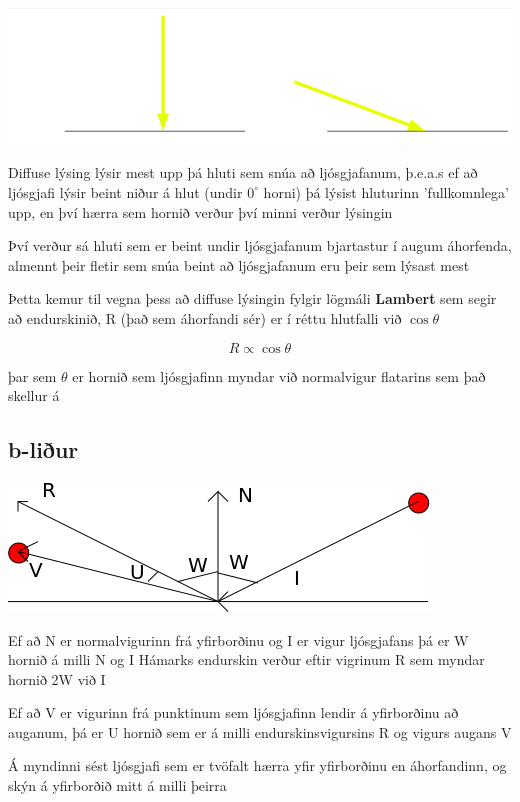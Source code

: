 \documentclass[11pt,twocolumn]{article}
\begin{document}
\includegraphics[width = \linewidth]{5.png}

Diffuse lýsing lýsir mest upp þá hluti sem snúa að ljósgjafanum, þ.e.a.s ef að ljósgjafi lýsir beint niður á hlut (undir $0^{\circ}$ horni) þá lýsist hluturinn 'fullkomnlega' upp, en því hærra sem hornið verður því minni verður lýsingin

Því verður sá hluti sem er beint undir ljósgjafanum bjartastur í augum áhorfenda, almennt þeir fletir sem snúa beint að ljósgjafanum eru þeir sem lýsast mest

Þetta kemur til vegna þess að diffuse lýsingin fylgir lögmáli \textbf{Lambert} sem segir að endurskinið, R (það sem áhorfandi sér) er í réttu hlutfalli við $\cos\theta$ 

\[
R \propto \cos\theta
\]

þar sem $\theta$ er hornið sem ljósgjafinn myndar við normalvigur flatarins sem það skellur á

\subsection*{b-liður}

\includegraphics[width = \linewidth]{D5A.png}

  Ef að N er normalvigurinn frá yfirborðinu og I er vigur ljósgjafans þá er  W hornið á milli N og I
  Hámarks endurskin verður eftir vigrinum R sem myndar hornið 2W við I

  Ef að V er vigurinn frá punktinum sem ljósgjafinn lendir á yfirborðinu að auganum, þá er U hornið sem er á milli endurskinsvigursins R og vigurs augans V

  Á myndinni sést ljósgjafi sem er tvöfalt hærra yfir yfirborðinu en áhorfandinn, og skýn á yfirborðið mitt á milli þeirra
\end{document}
